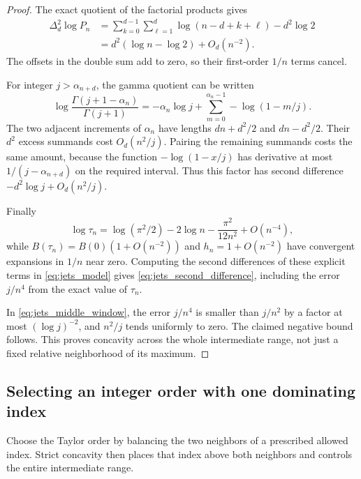 \documentclass[11pt]{article}
\numberwithin{equation}{section}
\theoremstyle{definition}
\begin{document}
\begin{proof}
The exact quotient of the factorial products gives
\begin{align*}
 \Delta_d^2\log P_n
 &=\sum_{k=0}^{d-1}\sum_{\ell=1}^d
       \log(n-d+k+\ell)-d^2\log2\\
 &=d^2(\log n-\log2)+O_d(n^{-2}).
\end{align*}
The offsets in the double sum add to zero, so their first-order
$1/n$ terms cancel.

For integer $j>\alpha_{n+d}$, the gamma quotient can be written
\[
 \log\frac{\Gamma(j+1-\alpha_n)}{\Gamma(j+1)}
 =-\alpha_n\log j+
   \sum_{m=0}^{\alpha_n-1}-\log(1-m/j).
\]
The two adjacent increments of $\alpha_n$ have lengths
$dn+d^2/2$ and $dn-d^2/2$. Their $d^2$ excess summands cost
$O_d(n^2/j)$. Pairing the remaining summands costs the same amount,
because the function $-\log(1-x/j)$ has derivative at most
$1/(j-\alpha_{n+d})$ on the required interval. Thus this factor has
second difference $-d^2\log j+O_d(n^2/j)$.

Finally
\[
 \log\tau_n=\log(\pi^2/2)-2\log n
             -\frac{\pi^2}{12n^2}+O(n^{-4}),
\]
while $B(\tau_n)=B(0)(1+O(n^{-2}))$ and $h_n=1+O(n^{-2})$
have convergent expansions in $1/n$ near zero. Computing the
second differences of these explicit terms in
\eqref{eq:jets_model} gives
\eqref{eq:jets_second_difference}, including the error $j/n^4$
from the exact value of $\tau_n$.

In \eqref{eq:jets_middle_window}, the error $j/n^4$ is smaller than
$j/n^2$ by a factor at most $(\log j)^{-2}$, and $n^2/j$ tends
uniformly to zero. The claimed negative bound follows. This proves
concavity across the whole intermediate range, not just a fixed
relative neighborhood of its maximum.
\end{proof}

\subsection{Selecting an integer order with one dominating index}

Choose the Taylor order by balancing the two neighbors of a prescribed
allowed index. Strict concavity then places that index above both
neighbors and controls the entire intermediate range.
\end{document}
